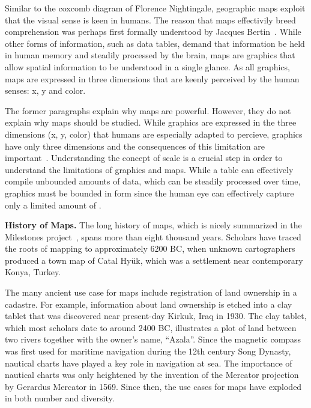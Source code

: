 \documentclass[11pt, oneside]{report}
\begin{document}
{Similar to the coxcomb diagram of Florence Nightingale, geographic maps exploit that the visual sense is keen in humans. The reason that maps effectivily breed comprehension was perhaps first formally understood by Jacques Bertin~\cite{bertin1967semiologie}. While other forms of information, such as data tables, demand that information be held in human memory and steadily processed by the brain, maps are graphics that allow spatial information to be understood in a single glance. As all graphics, maps are expressed in three dimensions that are keenly perceived by the human senses: x, y and color.

The former paragraphs explain why maps are powerful. However, they do not explain why maps should be studied. While graphics are expressed in the three dimensions (x, y, color) that humans are especially adapted to percieve, graphics have only three dimensions and the consequences of this limitation are important~\cite{bertin1967semiologie}. Understanding the concept of scale is a crucial step in order to understand the limitations of graphics and maps. While a table can effectively compile unbounded amounts of data, which can be steadily processed over time, graphics must be bounded in form since the human eye can effectively capture only a limited amount of .

\textbf{History of Maps.}
The long history of maps, which is nicely summarized in the Milestones project~\cite{friendly2008milestones}, spans more than eight thousand years. Scholars have traced the roots of mapping to approximately 6200 BC, when unknown cartographers produced a town map of Catal Hy{\"u}k, which was a settlement near contemporary Konya, Turkey. 

The many ancient use case for maps include registration of land ownership in a cadastre. For example, information about land ownership is etched into a clay tablet that was discovered near present-day Kirkuk, Iraq in 1930. The clay tablet, which most scholars date to around 2400 BC, illustrates a plot of land between two rivers together with the owner's name, ``Azala''. Since the magnetic compass was first used for maritime navigation during the 12th century Song Dynasty, nautical charts have played a key role in navigation at sea. The importance of nautical charts was only heightened by the invention of the Mercator projection by Gerardus Mercator in 1569. Since then, the use cases for maps have exploded in both number and diversity.

}
\end{document}
